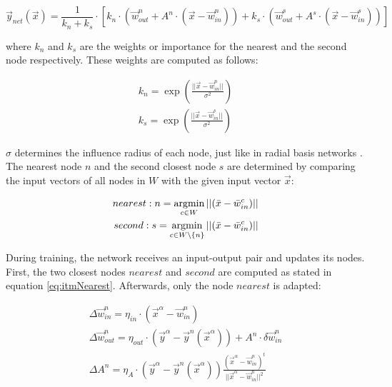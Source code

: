 \begin{equation}
\vec{y}_{net}(\vec{x}) =  \frac{1}{k_n+k_s} \cdot \left[ k_n \cdot \left(\vec{w}^n_{out} + A^n \cdot \left(\vec{x}-\vec{w}^n_{in}\right)\right) + k_s \cdot  \left(\vec{w}^s_{out} + A^s \cdot \left(\vec{x}-\vec{w}^s_{in}\right)\right)\right]
\end{equation}

where $k_n$ and $k_s$ are the weights or importance for the nearest and the second node respectively. These weights are computed as follows:

\begin{equation}
\begin{split}
k_n = \exp\left(\frac{||\vec{x}-\vec{w}^n_{in}||}{\sigma^2}\right) \\
k_s = \exp\left(\frac{||\vec{x}-\vec{w}^s_{in}||}{\sigma^2}\right) 
\end{split}
\end{equation}

$\sigma$ determines the influence radius of each node, just like in radial basis networks \cite{rbf}. The nearest node $n$ and the second closest node $s$ are determined by comparing the input vectors of all nodes in $W$ with the given input vector $\vec{x}$:

\begin{equation}
\begin{split}
	nearest: n = \argmin_{c\in W} ||(\vec{x} - \vec{w}^c_{in})|| \\
	second: s = \argmin_{c\in W\backslash\{n\}} ||(\vec{x} - \vec{w}^c_{in})||
\end{split}
\label{eq:itmNearest}
\end{equation}

During training, the network receives an input-output pair and updates its nodes. First, the two closest nodes $nearest$ and $second$ are computed as stated in equation \ref{eq:itmNearest}. Afterwards, only the node $nearest$ is adapted:

\begin{equation}
\begin{split}
\Delta \vec{w}^n_{in} = \eta_{in} \cdot (\vec{x}^\alpha - \vec{w}^n_{in}) \\
\Delta \vec{w}^n_{out} = \eta_{out} \cdot (\vec{y}^\alpha - \vec{y}^n(\vec{x}^\alpha)) + A^n \cdot \delta \vec{w}^n_{in} \\
\Delta A^n = \eta_A \cdot (\vec{y}^\alpha - \vec{y}^n(\vec{x}^\alpha)) \frac{(\vec{x}^\alpha - \vec{w}^n_{in})^t}{||\vec{x}^\alpha - \vec{w}^n_{in}||^2}
\end{split}
\end{equation}

